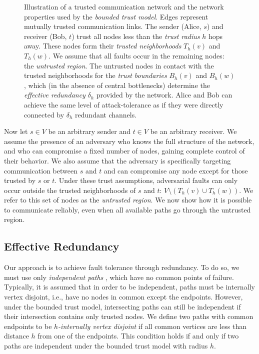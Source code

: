 \documentclass[10pt,letterpaper]{article}
\begin{document}
\begin{figure}[H]
\caption{
Illustration of a trusted communication network and the network properties
used by the {\em bounded trust model}.
Edges represent mutually trusted communication links.
The sender (Alice, $s$) and receiver (Bob, $t$) trust all nodes
less than the {\em trust radius} $h$ hops away.
These nodes form their {\em trusted neighborhoods} $T_h(v)$ and $T_h(w)$.
We assume that all faults occur in the remaining nodes: the
{\em untrusted region}.
The untrusted nodes in contact with the trusted neighborhoods for the
{\em trust boundaries} $B_h(v)$ and $B_h(w)$,
which (in the absence of central bottlenecks) determine the
{\em effective redundancy} $\delta_h$ provided by the network.
Alice and Bob can achieve the same level of attack-tolerance
as if they were directly connected by $\delta_h$ redundant channels.
}
\label{fig:trust-source}
\end{figure}

Now let $s \in V$ be an arbitrary sender
and $t \in V$ be an arbitrary receiver.
We assume the presence of an adversary who knows the
full structure of the network,
and who can compromise a fixed number of nodes,
gaining complete control of their behavior.
We also assume that the adversary is specifically targeting communication
between $s$ and $t$ and
can compromise any node except for those trusted by $s$ or $t$.
Under these trust assumptions, adversarial faults can only occur
outside the trusted neighborhoods of $s$ and $t$:
$V \setminus \left(T_h(v) \cup T_h(w)\right)$.
We refer to this set of nodes as the {\em untrusted region}.
We now show how it is possible to communicate reliably,
even when all available paths go through the untrusted region.

\subsection*{Effective Redundancy}

Our approach is to achieve fault tolerance through redundancy.
To do so, we must use only
{\em independent paths} \cite{reiter_resilient_1998},
which have no common points of failure.
Typically, it is assumed that in order to be independent,
paths must be internally vertex disjoint, i.e.,
have no nodes in common except the endpoints.
However, under the bounded trust model,
intersecting paths can still be independent if their
intersection contains only trusted nodes.
We define two paths with common endpoints
to be {\em $h$-internally vertex disjoint}
if all common vertices are less than distance $h$ from
one of the endpoints.
This condition holds if and only if two paths are independent
under the bounded trust model with radius $h$.
\end{document}
